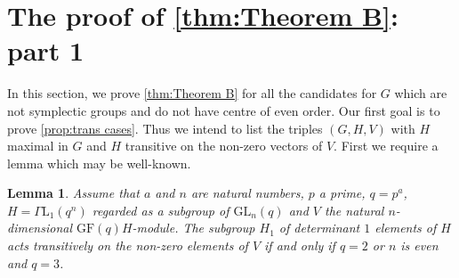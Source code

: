 \documentclass[12pt]{amsart}
\newtheorem{lemma}[theorem]{Lemma}
\theoremstyle{remark}
\theoremstyle{notation}
\theoremstyle{definition}
\newcommand{\GF}{\mathrm{GF}}
\newcommand{\GL}{\mathrm{GL}}
\newcommand{\0}{\emptyset}
\begin{document}
\section{The proof of \cref{thm:Theorem B}: part 1}\label{sec:ThmB1}

In this section, we prove \cref{thm:Theorem B} for all the candidates for $G$ which are not symplectic groups and do not have centre of even order. Our first goal is to prove \cref{prop:trans cases}. Thus we intend to list the triples $(G,H,V)$ with $H$ maximal in $G$ and $H$ transitive on the non-zero vectors of $V$. First we require a lemma which may be well-known.




\begin{lemma}\label{Normal basis lemma}
Assume that $a$ and $n$ are natural numbers, $p$ a prime, $q=p^a$, $H=\Gamma\mathrm L_1(q^n)$ regarded as a subgroup of $\GL_n(q)$ and $V$   the natural $n$-dimensional $\GF(q)H$-module.  The subgroup $H_1$ of determinant $1$ elements of $H$ acts transitively on the non-zero elements of $V$ if and only if $q= 2$ or $n$ is even and $q=3$.
\end{lemma}
\end{document}
